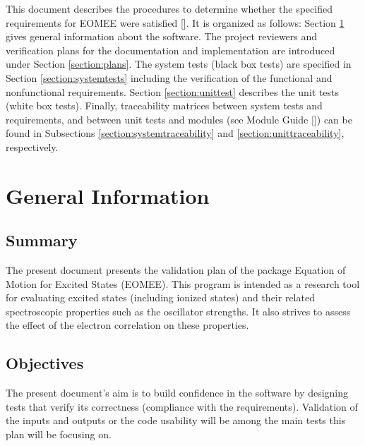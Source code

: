 \documentclass[12pt, titlepage]{article}
\begin{document}

\newpage


This document describes the procedures to determine whether the specified 
requirements for EOMEE were satisfied [\cite{SRS2020}]. It is organized as 
follows: Section \ref{section:geninfo} gives general information about the 
software. The project reviewers and verification plans for the documentation 
and implementation are introduced under Section \ref{section:plans}. The system 
tests (black box tests) are specified in Section \ref{section:systemtests} 
including the verification of the functional and nonfunctional requirements. 
Section \ref{section:unittest} describes the unit tests (white box tests). 
Finally, traceability matrices between system tests and requirements, and 
between unit tests and modules (see Module Guide [\cite{MG2020}]) can be found 
in Subsections \ref{section:systemtraceability} and 
\ref{section:unittraceability}, respectively.

\section{General Information}
\label{section:geninfo}

\subsection{Summary}

The present document presents the validation plan of the package Equation of 
Motion for Excited States (EOMEE). This program is intended as a research tool 
for evaluating excited states (including ionized states) and their related 
spectroscopic properties such as the oscillator strengths. It also strives to 
assess the effect of the electron correlation on these properties.

\subsection{Objectives}

The present document's aim is to build confidence in the software by designing 
tests that verify its correctness (compliance with the requirements). 
Validation of the inputs and outputs or the 
code usability will be among the main tests this plan will be focusing on.
\end{document}
